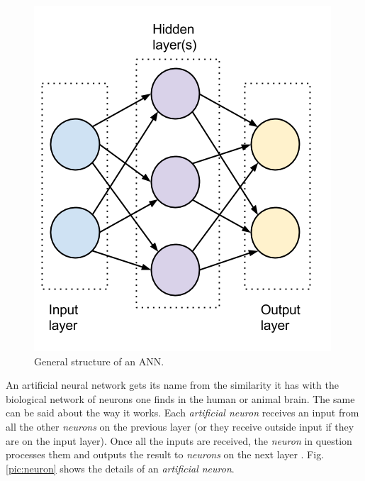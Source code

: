 \begin{figure}[h]
	\begin{center}
		\includegraphics[scale=0.6]{figures/ANN.png}
	\end{center}
	
	\caption{General structure of an ANN.}
	\label{pic:ann}

\end{figure} 

An artificial neural network gets its name from the similarity it has with the biological network of neurons one finds in the human or animal brain. The same can be said about the way it works. Each \textit{artificial neuron} receives an input from all the other \textit{neurons} on the previous layer (or they receive outside input if they are on the input layer). Once all the inputs are received, the \textit{neuron} in question processes them and outputs the result to \textit{neurons} on the next layer \cite{annintroduction}. Fig. \ref{pic:neuron} shows the details of an \textit{artificial neuron}.

